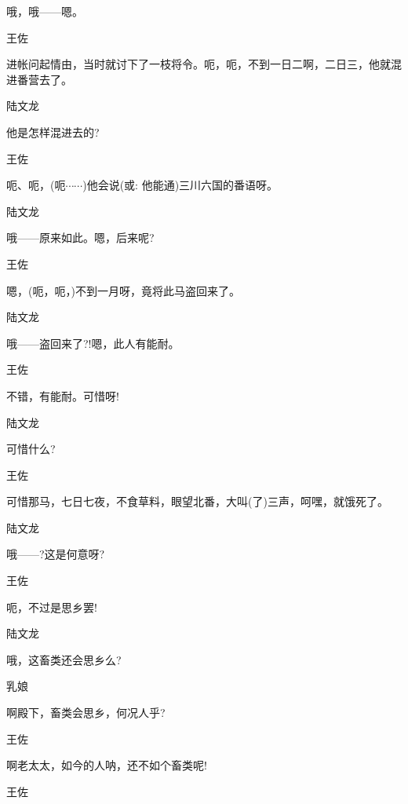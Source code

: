 {{{哦，哦------嗯。}

{王佐

进帐问起情由，当时就讨下了一枝将令。呃，呃，不到一日二啊，二日三，他就混进番营去了。}

{陆文龙\hspace{20pt}~

他是怎样混进去的?}

{王佐

呃、呃，(呃$\cdots{}\cdots{}$)他会说({\akai 或}: 他能通)三川六国的番语呀。}

{陆文龙\hspace{20pt}~

哦------原来如此。嗯，后来呢?}

{王佐\hspace{30pt}~

嗯，(呃，呃，)不到一月呀，竟将此马盗回来了。}

{陆文龙\hspace{20pt}~

哦------盗回来了?!嗯，此人有能耐。}

{王佐\hspace{30pt}~

不错，有能耐。可惜呀!}

{陆文龙\hspace{20pt}~

可惜什么?}

{王佐

可惜那马，七日七夜，不食草料，眼望北番，大叫(了)三声，呵嘿，就饿死了。}

{陆文龙\hspace{20pt}~

哦------?这是何意呀?}

{王佐\hspace{30pt}~

呃，不过是思乡罢!}

{陆文龙\hspace{20pt}~

哦，这畜类还会思乡么?}

{乳娘\hspace{30pt}~

啊殿下，畜类会思乡，何况人乎?}

{王佐\hspace{30pt}~

啊老太太，如今的人呐，还不如个畜类呢!}

{王佐

 }

}}
